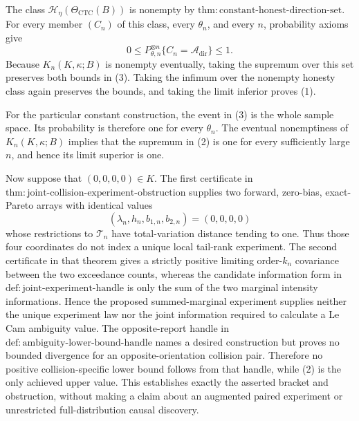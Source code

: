 The class \(\mathcal H_\eta(\Theta_{\mathrm{CTC}}(B))\) is nonempty by \(\mathrm{thm{:}constant\text{-}honest\text{-}direction\text{-}set}\).  For every member \((C_n)\) of this class, every \(\theta_n\), and every \(n\), probability axioms give
\[
 0\leq P_{\theta,n}^{\otimes n}\{C_n=\mathcal A_{\mathrm{dir}}\}\leq1. \tag{3}
\]
Because \(K_n(K,\kappa;B)\) is nonempty eventually, taking the supremum over this set preserves both bounds in (3).  Taking the infimum over the nonempty honesty class again preserves the bounds, and taking the limit inferior proves (1).

For the particular constant construction, the event in (3) is the whole sample space.  Its probability is therefore one for every \(\theta_n\).  The eventual nonemptiness of \(K_n(K,\kappa;B)\) implies that the supremum in (2) is one for every sufficiently large \(n\), and hence its limit superior is one.

Now suppose that \((0,0,0,0)\in K\).  The first certificate in \(\mathrm{thm{:}joint\text{-}collision\text{-}experiment\text{-}obstruction}\) supplies two forward, zero-bias, exact-Pareto arrays with identical values
\[
 (\lambda_n,h_n,b_{1,n},b_{2,n})=(0,0,0,0)
\]
whose restrictions to \(\mathcal T_n\) have total-variation distance tending to one.  Thus those four coordinates do not index a unique local tail-rank experiment.  The second certificate in that theorem gives a strictly positive limiting order-\(k_n\) covariance between the two exceedance counts, whereas the candidate information form in \(\mathrm{def{:}joint\text{-}experiment\text{-}handle}\) is only the sum of the two marginal intensity informations.  Hence the proposed summed-marginal experiment supplies neither the unique experiment law nor the joint information required to calculate a Le Cam ambiguity value.  The opposite-report handle in \(\mathrm{def{:}ambiguity\text{-}lower\text{-}bound\text{-}handle}\) names a desired construction but proves no bounded divergence for an opposite-orientation collision pair.  Therefore no positive collision-specific lower bound follows from that handle, while (2) is the only achieved upper value.  This establishes exactly the asserted bracket and obstruction, without making a claim about an augmented paired experiment or unrestricted full-distribution causal discovery.
